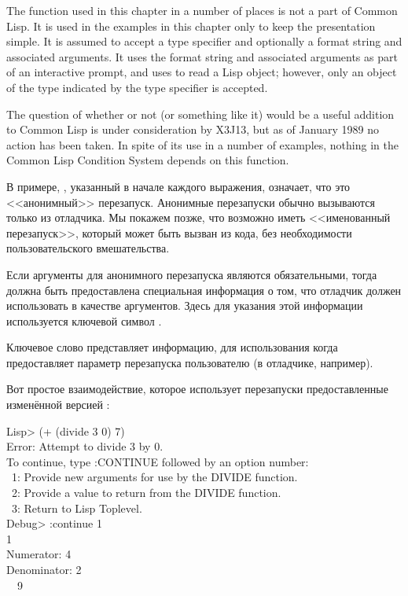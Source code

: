 \beforenoterule
\begin{sideremark}
    The function  used in this chapter in a number of places is
    not a part of Common Lisp.  It is used in the examples in this chapter only to keep
    the presentation simple.  It is assumed to accept a type specifier
     and optionally a format string and associated arguments.  It uses the
    format string and associated arguments as part of an interactive prompt,
    and uses  to read a Lisp object; however, only an object of the
    type indicated by the type specifier is accepted.

    The question of whether or not  (or something like it) would be a
    useful addition to Common Lisp is under consideration by X3J13, but as of
    January 1989 no action has been taken. In spite of its use in a number of examples,
    nothing in the Common Lisp Condition System depends on this function.
\end{sideremark}
\afternoterule

В примере, , указанный в начале каждого выражения, означает, что это
<<анонимный>> перезапуск. Анонимные перезапуски обычно вызываются только из
отладчика. Мы покажем позже, что возможно иметь <<именованный перезапуск>>,
который может быть вызван из кода, без необходимости пользовательского
вмешательства.

Если аргументы для анонимного перезапуска являются обязательными, тогда должна
быть предоставлена специальная информация о том, что отладчик должен
использовать в качестве аргументов. Здесь для указания этой информации
используется ключевой символ .

Ключевое слово  представляет информацию, для использования когда
предоставляет параметр перезапуска пользователю (в отладчике, например).

Вот простое взаимодействие, которое использует перезапуски предоставленные
изменённой версией :
\begin{lisp}
Lisp> (+ (divide 3 0) 7) \\
Error: Attempt to divide 3 by 0. \\
To continue, type :CONTINUE followed by an option number: \\
~1: Provide new arguments for use by the DIVIDE function. \\
~2: Provide a value to return from the DIVIDE function. \\
~3: Return to Lisp Toplevel. \\
Debug> :continue 1 \\
1 \\
Numerator: 4 \\
Denominator: 2 \\
~\EV\ 9
\end{lisp}

